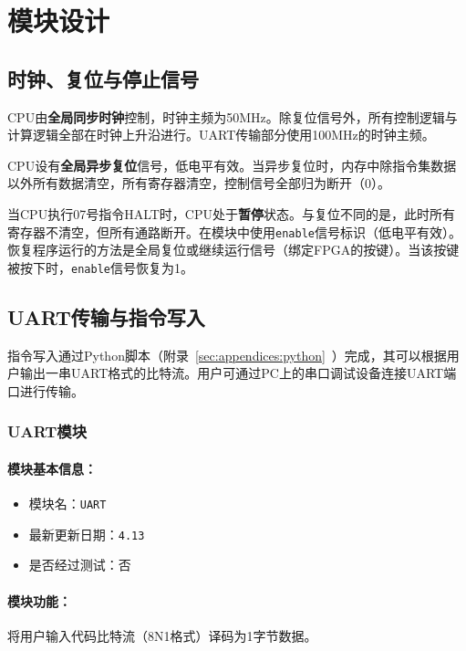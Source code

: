 \documentclass[lang=cn,a4paper,newtx]{elegantpaper}
\begin{document}

\section{模块设计}
\subsection{时钟、复位与停止信号}
CPU由\textbf{全局同步时钟}控制，时钟主频为50MHz。除复位信号外，所有控制逻辑与计算逻辑全部在时钟上升沿进行。UART传输部分使用100MHz的时钟主频。

CPU设有\textbf{全局异步复位}信号，低电平有效。当异步复位时，内存中除指令集数据以外所有数据清空，所有寄存器清空，控制信号全部归为断开（0）。

当CPU执行07号指令HALT时，CPU处于\textbf{暂停}状态。与复位不同的是，此时所有寄存器不清空，但所有通路断开。在模块中使用\texttt{enable}信号标识（低电平有效）。恢复程序运行的方法是全局复位或继续运行信号（绑定FPGA的按键）。当该按键被按下时，\texttt{enable}信号恢复为1。
\subsection{UART传输与指令写入}
指令写入通过Python脚本（附录~\ref{sec:appendices:python}~）完成，其可以根据用户输出一串UART格式的比特流。用户可通过PC上的串口调试设备连接UART端口进行传输。

\subsubsection{UART模块}
\paragraph{模块基本信息：}
\begin{itemize}
  \item 模块名：\texttt{UART}
  \item 最新更新日期：\texttt{4.13}
  \item 是否经过测试：否
\end{itemize}
\paragraph{模块功能：}
将用户输入代码比特流（8N1格式）译码为1字节数据。
\end{document}

